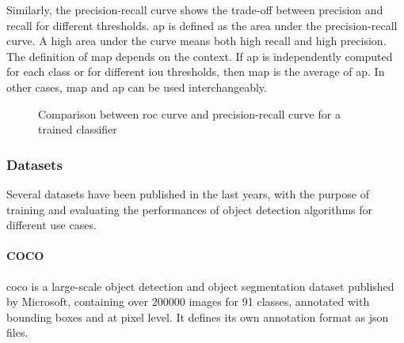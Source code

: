 \documentclass[%
    corpo=12pt,
    twoside,
    stile=classica,   
    tipotesi=magistrale,
    evenboxes,
    english,
	numerazioneromana,
]{toptesi}
\begin{document}
\medskip
Similarly, the precision-recall curve shows the trade-off between precision and recall for different thresholds\cite{precrecall}. \gls{ap} is defined as the area under the precision-recall curve. A high area under the curve means both high recall and high precision. The definition of \gls{map} depends on the context. If \gls{ap} is independently computed for each class or for different \gls{iou} thresholds, then \gls{map} is the average of \gls{ap}. In other cases, \gls{map} and \gls{ap} can be used interchangeably.

\begin{figure}[ht]
	\centering
	\caption{Comparison between \gls{roc} curve and precision-recall curve for a trained classifier}
	\label{fig:roc_map}
\end{figure}

\subsubsection{Datasets}\label{sec:datasets}
Several datasets have been published in the last years, with the purpose of training and evaluating the performances of object detection algorithms for different use cases.

\paragraph{COCO}\label{sec:coco}
\gls{coco} is a large-scale object detection and object segmentation dataset published by Microsoft, containing over 200000 images for 91 classes, annotated with bounding boxes and at pixel level\cite{lin2015microsoft}. It defines its own annotation format as \acrshort{json} files.
\end{document}
